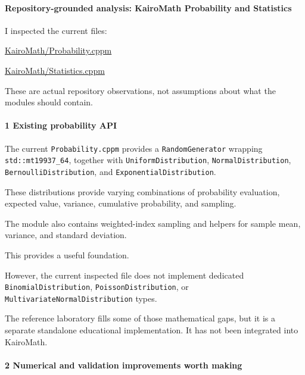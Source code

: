 \paragraph{Repository-grounded analysis: KairoMath Probability and Statistics}\label{02-foundations-ii-ch039-repository-grounded-analysis-kairomath-probability-and-statistics}

I inspected the current files:

\href{https://github.com/swayam8624/KairoMath/blob/master/Probability.cppm?utm_source=chatgpt.com}{KairoMath/Probability.cppm}

\href{https://github.com/swayam8624/KairoMath/blob/master/Statistics.cppm?utm_source=chatgpt.com}{KairoMath/Statistics.cppm}

These are actual repository observations, not assumptions about what the modules should contain.

\paragraph{1 Existing probability API}\label{02-foundations-ii-ch039-existing-probability-api}

The current \texttt{Probability.cppm} provides a \texttt{RandomGenerator} wrapping \texttt{std::mt19937\_64}, together with \texttt{UniformDistribution}, \texttt{NormalDistribution}, \texttt{BernoulliDistribution}, and \texttt{ExponentialDistribution}.

These distributions provide varying combinations of probability evaluation, expected value, variance, cumulative probability, and sampling.

The module also contains weighted-index sampling and helpers for sample mean, variance, and standard deviation.

This provides a useful foundation.

However, the current inspected file does not implement dedicated \texttt{BinomialDistribution}, \texttt{PoissonDistribution}, or \texttt{MultivariateNormalDistribution} types.

The reference laboratory fills some of those mathematical gaps, but it is a separate standalone educational implementation. It has not been integrated into KairoMath.

\paragraph{2 Numerical and validation improvements worth making}\label{02-foundations-ii-ch039-numerical-and-validation-improvements-worth-making}

